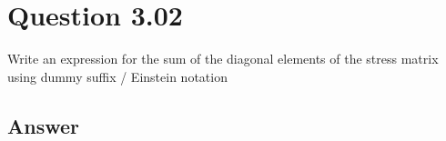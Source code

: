 \documentclass[
	12pt, %
]{fphw}
\begin{document}

\section*{Question 3.02}

\begin{problem}
Write an expression for the sum of the diagonal elements of the stress matrix using dummy suffix / Einstein notation
\end{problem}


\subsection*{Answer}

\begin{enumerate}

\end{enumerate}

\end{document}
